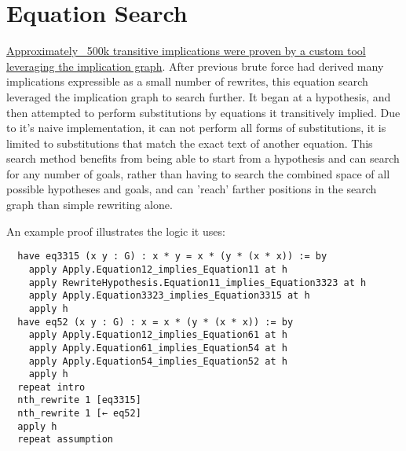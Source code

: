\chapter{Equation Search}

\href{https://github.com/teorth/equational_theories/tree/main/equational_theories/Generated/EquationSearch}{Approximately ~500k transitive implications were proven by a custom tool leveraging the implication graph}. After previous brute force had derived many implications expressible as a small number of rewrites, this equation search leveraged the implication graph to search further. It began at a hypothesis, and then attempted to perform substitutions by equations it transitively implied. Due to it's naive implementation, it can not perform all forms of substitutions, it is limited to substitutions that match the exact text of another equation. This search method benefits from being able to start from a hypothesis and can search for any number of goals, rather than having to search the combined space of all possible hypotheses and goals, and can 'reach' farther positions in the search graph than simple rewriting alone.

An example proof illustrates the logic it uses:

\begin{verbatim}
  have eq3315 (x y : G) : x * y = x * (y * (x * x)) := by
    apply Apply.Equation12_implies_Equation11 at h
    apply RewriteHypothesis.Equation11_implies_Equation3323 at h
    apply Apply.Equation3323_implies_Equation3315 at h
    apply h
  have eq52 (x y : G) : x = x * (y * (x * x)) := by
    apply Apply.Equation12_implies_Equation61 at h
    apply Apply.Equation61_implies_Equation54 at h
    apply Apply.Equation54_implies_Equation52 at h
    apply h
  repeat intro
  nth_rewrite 1 [eq3315]
  nth_rewrite 1 [← eq52]
  apply h
  repeat assumption
\end{verbatim}
